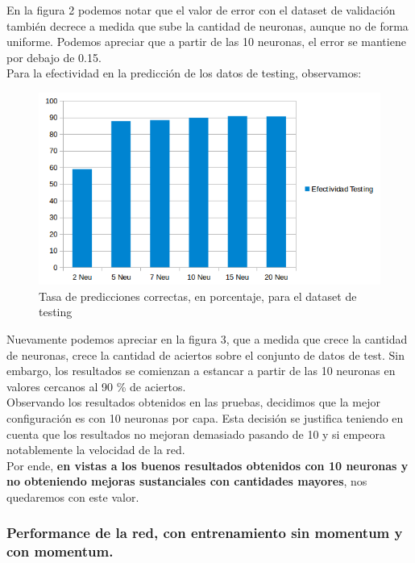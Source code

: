 En la figura 2 podemos notar que el valor de error con el dataset de validación también decrece a medida que sube la cantidad
de neuronas, aunque no de forma uniforme. Podemos apreciar que a partir de las 10 neuronas, el error se mantiene por debajo de 0.15.\\

Para la efectividad en la predicción de los datos de testing, observamos:

\begin{figure}[h]
  \begin{center}
  \includegraphics[scale=0.70]{graficos/fig3_cant_neuro_testing.png}
  \caption{Tasa de predicciones correctas, en porcentaje, para el dataset de testing}
  \end{center}
\end{figure}

Nuevamente podemos apreciar en la figura 3, que a medida que crece la cantidad de neuronas, crece la cantidad de aciertos sobre el conjunto de datos de test. Sin embargo, los resultados se comienzan a estancar a partir de las 10 neuronas en valores cercanos al 90 \% de aciertos.\\

Observando los resultados obtenidos en las pruebas, decidimos que la mejor configuración es con 10 neuronas por capa. Esta decisión se justifica teniendo en cuenta que los resultados no mejoran demasiado pasando de 10 y si empeora notablemente la velocidad de la red.\\
Por ende, \textbf{en vistas a los buenos resultados obtenidos con 10 neuronas y no obteniendo mejoras sustanciales con cantidades mayores}, nos quedaremos con este valor.

\subsubsection{Performance de la red, con entrenamiento sin momentum y con momentum.}


